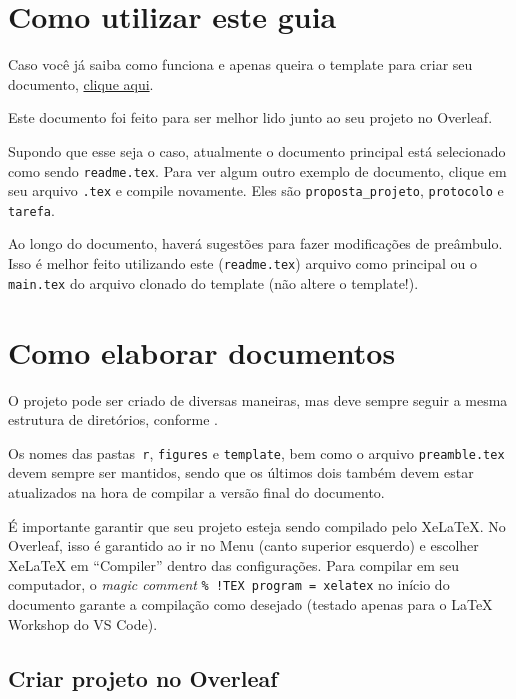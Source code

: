 \documentclass[brazilian, 11pt, oneside, a4paper]{article}
\begin{document}
\setFaixa
\geraTitulo
\sumario

\section{Como utilizar este guia}\label{sec:ComoUtilizar}

Caso você já saiba como funciona e apenas queira o template para criar seu documento, \href{https://www.overleaf.com/6265616139jqnrtzxkvzvp}{clique aqui}.

Este documento foi feito para ser melhor lido junto ao seu projeto no Overleaf.

Supondo que esse seja o caso, atualmente o documento principal está selecionado como sendo \verb$readme.tex$. Para ver algum outro exemplo de documento, clique em seu arquivo \verb$.tex$ e compile novamente. Eles são \verb$proposta_projeto$, \verb$protocolo$ e \verb$tarefa$.

Ao longo do documento, haverá sugestões para fazer modificações de preâmbulo. Isso é melhor feito utilizando este (\verb$readme.tex$) arquivo como principal ou o \verb$main.tex$ do arquivo clonado do template (não altere o template!).


\section{Como elaborar documentos}\label{sec:ComoElaborarDocumentos}

O projeto pode ser criado de diversas maneiras, mas deve sempre seguir a mesma estrutura de diretórios, conforme .


Os nomes das pastas\verb$ r$, \verb$figures$ e \verb$template$, bem como o arquivo \verb$preamble.tex$ devem sempre ser mantidos, sendo que os últimos dois também devem estar atualizados na hora de compilar a versão final do documento.

É importante garantir que seu projeto esteja sendo compilado pelo XeLaTeX. No Overleaf, isso é garantido ao ir no Menu (canto superior esquerdo) e escolher XeLaTeX em ``Compiler'' dentro das configurações. Para compilar em seu computador, o \textit{magic comment} \verb$% !TEX program = xelatex$ no início do documento garante a compilação como desejado (testado apenas para o LaTeX Workshop do VS Code).

\subsection{Criar projeto no Overleaf}
\end{document}
